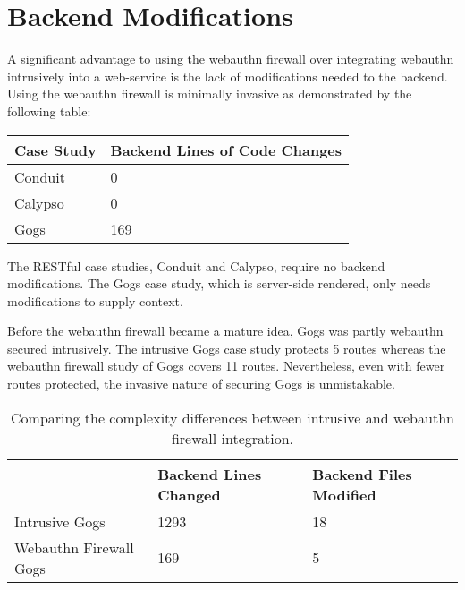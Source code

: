 \fi

\section{Backend Modifications}

A significant advantage to using the webauthn firewall over integrating webauthn intrusively into a web-service is the lack of modifications needed to the backend. Using the webauthn firewall is minimally invasive as demonstrated by the following table:

\begin{table}[h]
\centering

\begin{tabular}{ m{4.5cm} m{6cm}  } 
 \hline
 Case Study & Backend Lines of Code Changes \\ 
 \hline \hline

 Conduit & 0 \\ \hline

 Calypso & 0 \\ \hline

 Gogs & 169 \\ \hline

\end{tabular}
\end{table}

The RESTful case studies, Conduit and Calypso, require no backend modifications. The Gogs case study, which is server-side rendered, only needs modifications to supply context. 

Before the webauthn firewall became a mature idea, Gogs was partly webauthn secured intrusively. The intrusive Gogs case study protects 5 routes whereas the webauthn firewall study of Gogs covers 11 routes. Nevertheless, even with fewer routes protected, the invasive nature of securing Gogs is unmistakable.

\begin{table}[h]
\centering

\begin{tabular}{ m{5cm} m{4.5cm} m{4.5cm}  } 
 \hline
 & Backend Lines Changed & Backend Files Modified \\ 
 \hline \hline

 Intrusive Gogs & 1293 & 18 \\ \hline

 Webauthn Firewall Gogs & 169 & 5 \\ \hline


\end{tabular}
\caption{Comparing the complexity differences between intrusive and webauthn firewall integration.}
\end{table}

